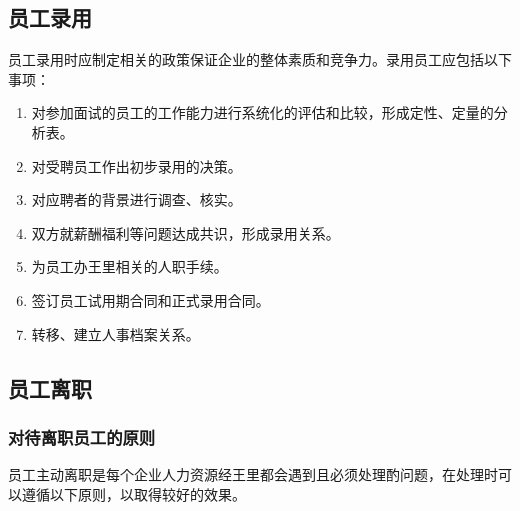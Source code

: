 \subsection {员工录用}

    员工录用时应制定相关的政策保证企业的整体素质和竞争力。录用员工应包括以下事项：

    \begin{enumerate}
        \item 对参加面试的员工的工作能力进行系统化的评估和比较，形成定性、定量的分析表。

        \item 对受聘员工作出初步录用的决策。

        \item 对应聘者的背景进行调查、核实。

        \item 双方就薪酬福利等问题达成共识，形成录用关系。

        \item 为员工办王里相关的人职手续。

        \item 签订员工试用期合同和正式录用合同。

        \item 转移、建立人事档案关系。
    \end{enumerate}

\subsection {员工离职}

\subsubsection {对待离职员工的原则}

    员工主动离职是每个企业人力资源经王里都会遇到且必须处理酌问题，在处理时可以遵循以下原则，以取得较好的效果。

